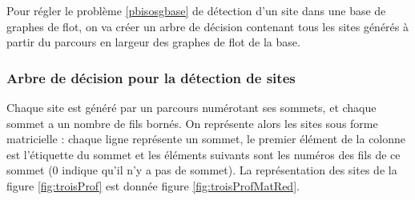 Pour régler le problème \ref{pbisosgbase} de détection d'un site dans une base de graphes de flot, on va créer un arbre de décision contenant tous les sites générés à partir du parcours en largeur des graphes de flot de la base.

\subsubsection{Arbre de décision pour la détection de sites}
Chaque site est généré par un parcours numérotant ses sommets, et chaque sommet a un nombre de fils bornés. On représente alors les sites sous forme matricielle : chaque ligne représente un sommet, le premier élément de la colonne est l'étiquette du sommet et les éléments suivants sont les numéros des fils de ce sommet (0 indique qu'il n'y a pas de sommet). La représentation des sites de la figure \ref{fig:troisProf} est donnée figure \ref{fig:troisProfMatRed}.

